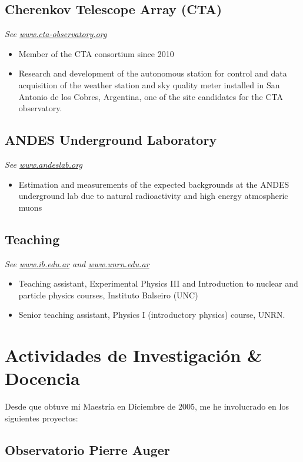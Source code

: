 \subsection*{Cherenkov Telescope Array (CTA)}
{\small{\textit{See \href{http://www.cta-observatory.org}{www.cta-observatory.org}}}}
\begin{itemize}
\item Member of the CTA consortium since 2010
\item Research and development of the autonomous station for control and data
acquisition of the weather station and sky quality meter installed in San
Antonio de los Cobres, Argentina, one of the site candidates for the CTA
observatory.
\end{itemize}

\subsection*{ANDES Underground Laboratory}
{\small{\textit{See \href{http://www.andeslab.org}{www.andeslab.org}}}}
\begin{itemize}
\item Estimation and measurements of the expected backgrounds at the ANDES
underground lab due to natural radioactivity and high energy atmospheric muons
\end{itemize}

\subsection*{Teaching}
{\small{\textit{See \href{http://www.ib.edu.ar}{www.ib.edu.ar} and
\href{http://www.unrn.edu.ar}{www.unrn.edu.ar}}}}
\begin{itemize}
\item Teaching assistant, Experimental Physics III and Introduction to nuclear
and particle physics courses, Instituto Balseiro (UNC)
\item Senior teaching assistant, Physics I (introductory physics) course, UNRN.
\end{itemize}
\else
\section*{Actividades de Investigación \& Docencia}

Desde que obtuve mi Maestría en Diciembre de 2005, me he involucrado en los siguientes proyectos:

\subsection*{Observatorio Pierre Auger}

